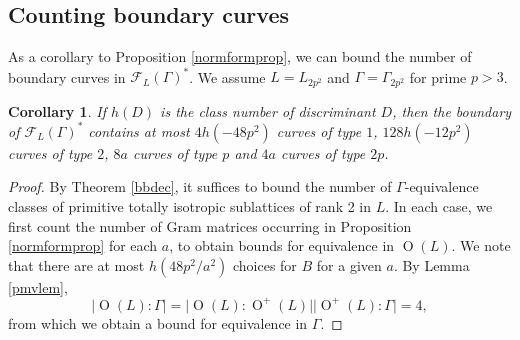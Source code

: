\documentclass[11pt]{article}
\newtheorem{cor}[thm]{Corollary}
\newcommand{\fc}{\mathcal{F}}
\newcommand{\opn}{\operatorname}
\newcommand{\beq}{\begin{equation*}}
\newcommand{\eeq}{\end{equation*}}
\begin{document}
\subsection{Counting boundary curves}
As a corollary to Proposition \ref{normformprop}, we can bound the number of boundary curves in $\fc_L(\Gamma)^*$.
We assume $L=L_{2p^2}$ and $\Gamma= \Gamma_{2p^2}$ for prime $p>3$.
\begin{cor}\label{curvecountcor}
   If $h(D)$ is the class number of discriminant $D$, then
   the boundary of $\fc_L(\Gamma)^*$ contains at most
 $4 h(-48 p^2)$ curves of type $1$,
 $128 h(-12 p^2)$ curves of type $2$,
 $8a$ curves of type $p$ and
 $4a$ curves of type $2p$.
\end{cor}
\begin{proof}
  By Theorem \ref{bbdec}, it suffices to bound the number of $\Gamma$-equivalence classes of primitive totally isotropic sublattices of rank 2 in $L$.
  In each case, we first count the number of Gram matrices occurring in  Proposition \ref{normformprop} for each $a$, to obtain bounds for equivalence in $\opn{O}(L)$.
  We note that there are at most $h(48p^2/a^2)$ choices for $B$ for a  given $a$.
  By Lemma \ref{pmvlem},
\beq
\vert \opn{O}(L) : \Gamma \vert = \vert \opn{O}(L) : \opn{O}^+(L) \vert \vert \opn{O}^+(L) : \Gamma \vert = 4,
\eeq
from which we obtain a bound for equivalence in $\Gamma$.
\end{proof}
\end{document}
